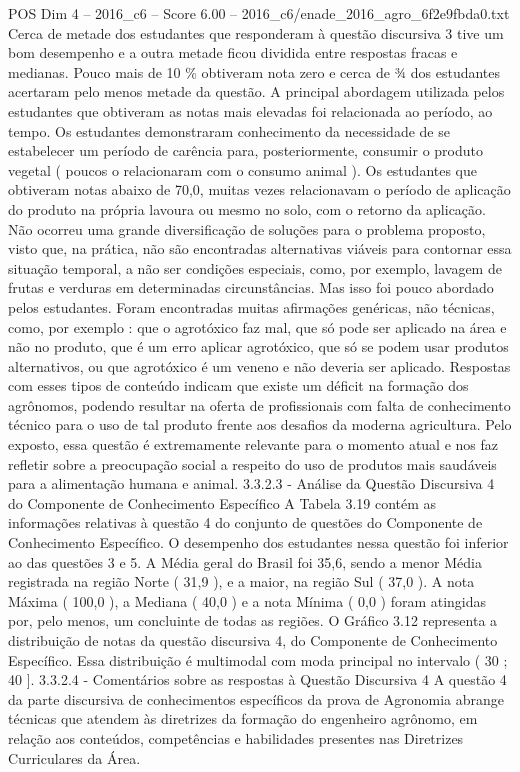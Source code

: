 \begin{textsample}{POS Dim 4 – 2016\_c6 – Score 6.00 – 2016\_c6/enade\_2016\_agro\_6f2e9fbda0.txt}
Cerca de metade dos estudantes que responderam à questão discursiva 3 tive um bom desempenho e a outra metade ficou dividida entre respostas fracas e medianas.
Pouco mais de 10 \% obtiveram nota zero e cerca de ¾ dos estudantes acertaram pelo menos metade da questão.
A principal abordagem utilizada pelos estudantes que obtiveram as notas mais elevadas foi relacionada ao período, ao tempo.
Os estudantes demonstraram conhecimento da necessidade de se estabelecer um período de carência para, posteriormente, consumir o produto vegetal ( poucos o relacionaram com o consumo animal ).
Os estudantes que obtiveram notas abaixo de 70,0, muitas vezes relacionavam o período de aplicação do produto na própria lavoura ou mesmo no solo, com o retorno da aplicação.
Não ocorreu uma grande diversificação de soluções para o problema proposto, visto que, na prática, não são encontradas alternativas viáveis para contornar essa situação temporal, a não ser condições especiais, como, por exemplo, lavagem de frutas e verduras em determinadas circunstâncias.
Mas isso foi pouco abordado pelos estudantes.
Foram encontradas muitas afirmações genéricas, não técnicas, como, por exemplo : que o agrotóxico faz mal, que só pode ser aplicado na área e não no produto, que é um erro aplicar agrotóxico, que só se podem usar produtos alternativos, ou que agrotóxico é um veneno e não deveria ser aplicado.
Respostas com esses tipos de conteúdo indicam que existe um déficit na formação dos agrônomos, podendo resultar na oferta de profissionais com falta de conhecimento técnico para o uso de tal produto frente aos desafios da moderna agricultura.
Pelo exposto, essa questão é extremamente relevante para o momento atual e nos faz refletir sobre a preocupação social a respeito do uso de produtos mais saudáveis para a alimentação humana e animal. 3.3.2.3 - Análise da Questão Discursiva 4 do Componente de Conhecimento Específico A Tabela 3.19 contém as informações relativas à questão 4 do conjunto de questões do Componente de Conhecimento Específico.
O desempenho dos estudantes nessa questão foi inferior ao das questões 3 e 5.
A Média geral do Brasil foi 35,6, sendo a menor Média registrada na região Norte ( 31,9 ), e a maior, na região Sul ( 37,0 ).
A nota Máxima ( 100,0 ), a Mediana ( 40,0 ) e a nota Mínima ( 0,0 ) foram atingidas por, pelo menos, um concluinte de todas as regiões.
O Gráfico 3.12 representa a distribuição de notas da questão discursiva 4, do Componente de Conhecimento Específico.
Essa distribuição é multimodal com moda principal no intervalo ( 30 ; 40 ]. 3.3.2.4 - Comentários sobre as respostas à Questão Discursiva 4 A questão 4 da parte discursiva de conhecimentos específicos da prova de Agronomia abrange técnicas que atendem às diretrizes da formação do engenheiro agrônomo, em relação aos conteúdos, competências e habilidades presentes nas Diretrizes Curriculares da Área.

\end{textsample}
